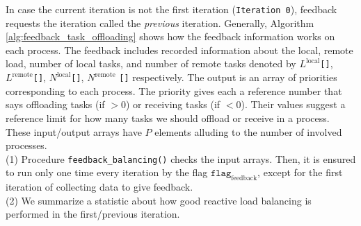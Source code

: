 \begin{algorithm}[t]
{%

		\nl {}
  }
  
			
\end{algorithm}

In case the current iteration is not the first iteration (\texttt{Iteration 0}), feedback requests the iteration called the \textit{previous} iteration. Generally, Algorithm \ref{alg:feedback_task_offloading} shows how the feedback information works on each process. The feedback includes recorded information about the local, remote load, number of local tasks, and number of remote tasks denoted by $L^{\text{local}}$\texttt{[]}, $L^{\text{remote}}$\texttt{[]}, $N^{\text{local}}$\texttt{[]}, $N^{\text{remote}}$ \texttt{[]} respectively. The output is an array of priorities corresponding to each process. The priority gives each a reference number that says offloading tasks (if $> 0$) or receiving tasks (if $< 0$). Their values suggest a reference limit for how many tasks we should offload or receive in a process. These input/output arrays have $P$ elements alluding to the number of involved processes.\\

(1) Procedure \texttt{feedback\_balancing()} checks the input arrays. Then, it is ensured to run only one time every iteration by the flag $\texttt{flag}_{\text{feedback}}$, except for the first iteration of collecting data to give feedback.\\

(2) We summarize a statistic about how good reactive load balancing is performed in the first/previous iteration.\\

